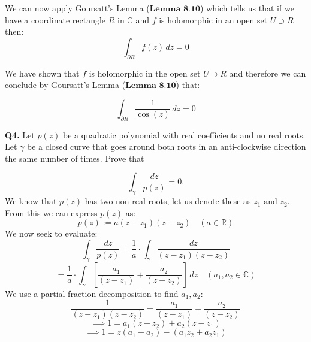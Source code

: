 \documentclass[12pt]{article}
\begin{document}
\begin{enumerate}[label=\textbf{(\roman*)}]

We can now apply Goursatt's Lemma (\(\textbf{Lemma 8.10}\)) which tells us that if we have a coordinate rectangle \(R\) in  \(\mathbb{C}\) and \(f\) is holomorphic in an open set \(U \supset R\) then: 
\[
\int_{\partial R} f(z) \, dz = 0
\]

We have shown that \(f\) is holomorphic in the open set \(U \supset R\) and therefore we can conclude by Goursatt's Lemma (\(\textbf{Lemma 8.10}\)) that:

\[
\int_{\partial R} \frac{1}{\cos(z)} \, dz = 0
\]

\end{enumerate}
\[\]
\textbf{Q4.} Let \(p(z)\) be a quadratic polynomial with real coefficients and no real roots. Let \(\gamma\) be a closed curve that goes around both roots in an anti-clockwise direction the same number of times. Prove that

\[
\int_{\gamma} \frac{dz}{p(z)} = 0.
\]
\[\]
\noindent We know that \(p(z)\) has two non-real roots, let us denote these as \(z_1 \text{ and } z_2\).\newline
\linebreak
From this we can express \(p(z)\) as:
\[
p(z) := a\left(z-z_1\right)\left(z-z_2\right) \quad (a \in \mathbb{R})
\]
We now seek to evaluate:
\[
\int_{\gamma} \frac{dz}{p(z)} = \frac{1}{a} \cdot \int_{\gamma} \frac{dz}{\left(z-z_1\right)\left(z-z_2\right)}
\]
\[
=\frac{1}{a} \cdot \int_{\gamma} \left[\frac{a_1}{\left(z-z_1\right)} + \frac{a_2}{\left(z-z_2\right)}\right] \, dz \quad (a_1, a_2 \in \mathbb{C})
\]
\[\]
\noindent We use a partial fraction decomposition to find \(a_1, a_2\):
\[
    \frac{1}{\left(z-z_1\right)\left(z-z_2\right)} = \frac{a_1}{\left(z-z_1\right)} + \frac{a_2}{\left(z-z_2\right)}
\]
\[
\implies 1 = a_1\left(z-z_2\right) + a_2\left(z-z_1\right)
\]
\[
\implies 1 = z\left(a_1 + a_2\right) - \left(a_1z_2 + a_2z_1\right)
\]
\end{document}
